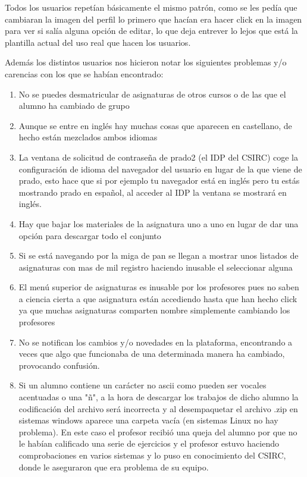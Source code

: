 \bigskip
Todos los usuarios repetían básicamente el mismo patrón, como se les pedía que cambiaran la imagen del perfil lo primero que hacían era hacer click en la imagen para ver si salía alguna opción de editar, lo que deja entrever lo lejos que está la plantilla actual del uso real que hacen los usuarios. 

\bigskip
Además los distintos usuarios nos hicieron notar los siguientes problemas y/o carencias con los que se habían encontrado:

\begin{enumerate}

\item No se puedes desmatricular de asignaturas de otros cursos o de las que el alumno ha cambiado de grupo

\item Aunque se entre en inglés hay muchas cosas que aparecen en castellano, de hecho están mezclados ambos idiomas

\item La ventana de solicitud de contraseña de prado2 (el IDP del CSIRC) coge la configuración de idioma del navegador del usuario en lugar de la que viene de prado, esto hace que si por ejemplo tu navegador está en inglés pero tu estás mostrando prado en español, al acceder al IDP la ventana se mostrará en inglés.

\item Hay que bajar los materiales de la asignatura uno a uno en lugar de dar una opción para descargar todo el conjunto

\item Si se está navegando por la miga de pan se llegan a mostrar unos listados de asignaturas con mas de mil registro haciendo inusable el seleccionar alguna

\item El menú superior de asignaturas es inusable por los profesores pues no saben a ciencia cierta a que asignatura están accediendo hasta que han hecho click ya que muchas asignaturas comparten nombre simplemente cambiando los profesores

\item No se notifican los cambios y/o novedades en la plataforma, encontrando a veces que algo que funcionaba de una determinada manera ha cambiado, provocando confusión.

\item Si un alumno contiene un carácter no ascii como pueden ser vocales acentuadas o una "ñ", a la hora de descargar los trabajos de dicho alumno la codificación del archivo será incorrecta y al desempaquetar el archivo .zip en sistemas windows aparece una carpeta vacía (en sistemas Linux no hay problema). En este caso el profesor recibió una queja del alumno por que no le habían calificado una serie de ejercicios y el profesor estuvo haciendo comprobaciones en varios sistemas y lo puso en conocimiento del CSIRC, donde le aseguraron que era problema de su equipo. 


\end{enumerate}
